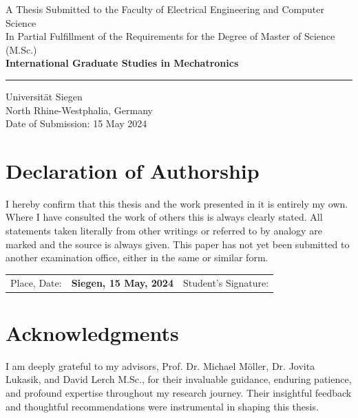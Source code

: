 \documentclass{report} %
\begin{document}
\begin{titlepage}
    \normalsize{A Thesis Submitted to the Faculty of Electrical Engineering and Computer Science}\\
    \normalsize{In Partial Fulfillment of the Requirements for the Degree of Master of Science (M.Sc.)}\\
    \normalsize{\textbf{International Graduate Studies in Mechatronics}}\\
    \vfill
    \rule{\textwidth}{0.4pt}
    \normalsize{Universität Siegen}\\
    \normalsize{North Rhine-Westphalia, Germany}\\
    \normalsize{Date of Submission: 15 May 2024}\\
\end{titlepage}

\chapter*{Declaration of Authorship}

I hereby confirm that this thesis and the work presented in it is entirely my own. Where I have
consulted the work of others this is always clearly stated. All statements taken literally from other
writings or referred to by analogy are marked and the source is always given. This paper has not yet
been submitted to another examination office, either in the same or similar form. 

\vspace{10mm} %

\noindent
\begin{tabular}{@{}lll@{}}
    Place, Date: & \textbf{Siegen, 15 May, 2024} & \hspace{1cm} Student's Signature: \hrulefill \\
\end{tabular}

\chapter*{Acknowledgments}
I am deeply grateful to my advisors, Prof. Dr. Michael Möller, Dr. Jovita Lukasik, and David Lerch M.Sc., for their invaluable guidance, enduring patience, and profound expertise throughout my research journey. Their insightful feedback and thoughtful recommendations were instrumental in shaping this thesis.
\end{document}
